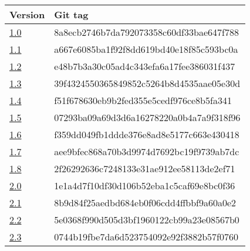 \begin{longtable}[]{@{}ll@{}}
\toprule
Version & Git tag\tabularnewline
\midrule
\endhead
\href{https://gitlab.com/PsdSolver/psd_sources/-/tree/v1.0}{1.0} &
8a8ecb2746b7da792073358c60df33bae647f788\tabularnewline
\href{https://gitlab.com/PsdSolver/psd_sources/-/tree/v1.1}{1.1} &
a667e6085ba1f92f8dd619bd40e18f85c593bc0a\tabularnewline
\href{https://gitlab.com/PsdSolver/psd_sources/-/tree/v1.2}{1.2} &
e48b7b3a30c05ad4c343efa6a17fee386031f437\tabularnewline
\href{https://gitlab.com/PsdSolver/psd_sources/-/tree/v1.3}{1.3} &
39f4324550365849852c5264b8d4535aae05e30d\tabularnewline
\href{https://gitlab.com/PsdSolver/psd_sources/-/tree/v1.4}{1.4} &
f51f678630eb9b2fed355e5cedf976ce8b5fa341\tabularnewline
\href{https://gitlab.com/PsdSolver/psd_sources/-/tree/v1.5}{1.5} &
07293ba09a69d3d6a16278220a0b4a7a9f318f96\tabularnewline
\href{https://gitlab.com/PsdSolver/psd_sources/-/tree/v1.6}{1.6} &
f359dd049fb1ddde376e8ad8e5177c663e430418\tabularnewline
\href{https://gitlab.com/PsdSolver/psd_sources/-/tree/v1.7}{1.7} &
aee9bfec868a70b3d9974d7692bc19f9739ab7dc\tabularnewline
\href{https://gitlab.com/PsdSolver/psd_sources/-/tree/v1.8}{1.8} &
2f26292636c7248133e31ae912ee58113de2ef71\tabularnewline
\href{https://gitlab.com/PsdSolver/psd_sources/-/tree/v2.0}{2.0} &
1e1a4d7f10df30d106b52eba1c5caf69e8bc0f36\tabularnewline
\href{https://gitlab.com/PsdSolver/psd_sources/-/tree/v2.1}{2.1} &
8b9d84f25aedbd684eb0f06cdd4ffbbf9a60a0e2\tabularnewline
\href{https://gitlab.com/PsdSolver/psd_sources/-/tree/v2.2}{2.2} &
5e0368f990d505d3bf1960122cb99a23e08567b0\tabularnewline
\href{https://gitlab.com/PsdSolver/psd_sources/-/tree/v2.3}{2.3} &
0744b19fbe7da6d523754092e92f3882b57f0760\tabularnewline
\bottomrule
\end{longtable}
